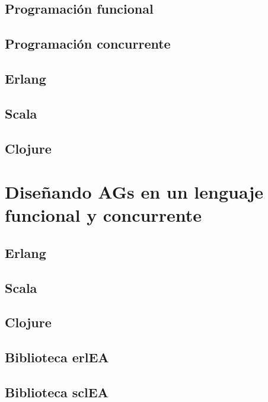 \documentclass[runningheads]{llncs}
\begin{document}
\subsection{Programación funcional}
    

\subsection{Programación concurrente}
    

\subsection{Erlang}
    

\subsection{Scala}
    

\subsection{Clojure}
    


\section{Diseñando AGs en un lenguaje funcional y concurrente}
\label{sec:design}
    

\subsection{Erlang}
    

\subsection{Scala}
    

\subsection{Clojure}
    

\subsection{Biblioteca erlEA}
    

\subsection{Biblioteca sclEA}
    
\end{document}
